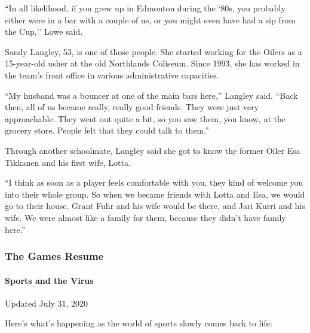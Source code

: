 ``In all likelihood, if you grew up in Edmonton during the `80s, you
probably either were in a bar with a couple of us, or you might even
have had a sip from the Cup,'' Lowe said.

Sandy Langley, 53, is one of those people. She started working for the
Oilers as a 15-year-old usher at the old Northlands Coliseum. Since
1993, she has worked in the team's front office in various
administrative capacities.

``My husband was a bouncer at one of the main bars here,'' Langley said.
``Back then, all of us became really, really good friends. They were
just very approachable. They went out quite a bit, so you saw them, you
know, at the grocery store. People felt that they could talk to them.''

Through another schoolmate, Langley said she got to know the former
Oiler Esa Tikkanen and his first wife, Lotta.

``I think as soon as a player feels comfortable with you, they kind of
welcome you into their whole group. So when we became friends with Lotta
and Esa, we would go to their house. Grant Fuhr and his wife would be
there, and Jari Kurri and his wife. We were almost like a family for
them, because they didn't have family here.''

\hypertarget{the-games-resume}{%
\subsubsection{The Games Resume}\label{the-games-resume}}

\hypertarget{sports-and-the-virus}{%
\paragraph{Sports and the Virus}\label{sports-and-the-virus}}

Updated July 31, 2020

Here's what's happening as the world of sports slowly comes back to
life:

